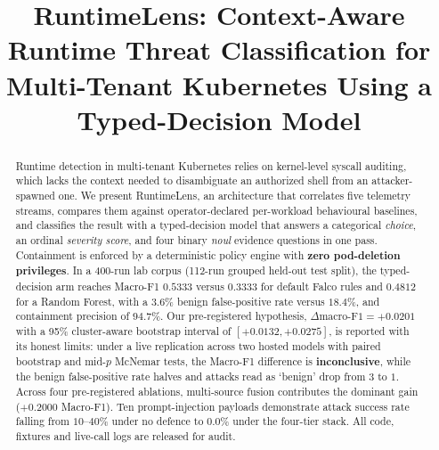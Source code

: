 \documentclass[conference]{IEEEtran}
\begin{document}
\title{\bfseries RuntimeLens: Context-Aware Runtime Threat Classification for Multi-Tenant Kubernetes Using a Typed-Decision Model}

\author{
}
\maketitle

\begin{abstract}
Runtime detection in multi-tenant Kubernetes relies on kernel-level syscall auditing, which lacks the context needed to disambiguate an authorized shell from an attacker-spawned one. We present RuntimeLens, an architecture that correlates five telemetry streams, compares them against operator-declared per-workload behavioural baselines, and classifies the result with a typed-decision model that answers a categorical \emph{choice}, an ordinal \emph{severity score}, and four binary \emph{noul} evidence questions in one pass. Containment is enforced by a deterministic policy engine with \textbf{zero pod-deletion privileges}. In a 400-run lab corpus (112-run grouped held-out test split), the typed-decision arm reaches Macro-F1 $\mathbf{0.5333}$ versus $\mathbf{0.3333}$ for default Falco rules and $0.4812$ for a Random Forest, with a $\mathbf{3.6\%}$ benign false-positive rate versus $\mathbf{18.4\%}$, and containment precision of $\mathbf{94.7\%}$. Our pre-registered hypothesis, $\Delta\text{macro-F1} = \mathbf{+0.0201}$ with a 95\% cluster-aware bootstrap interval of $\mathbf{[+0.0132, +0.0275]}$, is reported with its honest limits: under a live replication across two hosted models with paired bootstrap and mid-$p$ McNemar tests, the Macro-F1 difference is \textbf{inconclusive}, while the benign false-positive rate halves and attacks read as `benign' drop from $3$ to $1$. Across four pre-registered ablations, multi-source fusion contributes the dominant gain ($+0.2000$ Macro-F1). Ten prompt-injection payloads demonstrate attack success rate falling from $10$--$40\%$ under no defence to $\mathbf{0.0\%}$ under the four-tier stack. All code, fixtures and live-call logs are released for audit.
\end{abstract}
\end{document}
